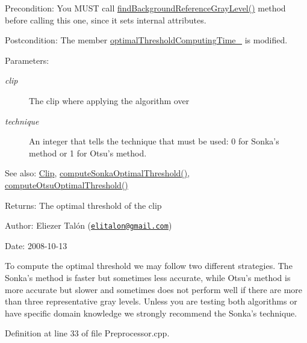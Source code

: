 \begin{Desc}
\item[Precondition:]You MUST call \hyperlink{class_preprocessor_a941f81382bd8e235e4dd12481342be4}{findBackgroundReferenceGrayLevel()} method before calling this one, since it sets internal attributes. \end{Desc}
\begin{Desc}
\item[Postcondition:]The member \hyperlink{class_preprocessor_d606fe1f0be7f7be60583f59278e2df6}{optimalThresholdComputingTime\_\-} is modified.\end{Desc}
\begin{Desc}
\item[Parameters:]
\begin{description}
\item[{\em clip}]The clip where applying the algorithm over \item[{\em technique}]An integer that tells the technique that must be used: 0 for Sonka's method or 1 for Otsu's method.\end{description}
\end{Desc}
\begin{Desc}
\item[See also:]\hyperlink{class_clip}{Clip}, \hyperlink{class_preprocessor_3d4fa7e4721c62997beb93a41d729c99}{computeSonkaOptimalThreshold()}, \hyperlink{class_preprocessor_faa4368f471a3e5d0cb46865a2a1ccb7}{computeOtsuOptimalThreshold()}\end{Desc}
\begin{Desc}
\item[Returns:]The optimal threshold of the clip\end{Desc}
\begin{Desc}
\item[Author:]Eliezer Talón (\href{mailto:elitalon@gmail.com}{\tt elitalon@gmail.com}) \end{Desc}
\begin{Desc}
\item[Date:]2008-10-13\end{Desc}
To compute the optimal threshold we may follow two different strategies. The Sonka's method is faster but sometimes less accurate, while Otsu's method is more accurate but slower and sometimes does not perform well if there are more than three representative gray levels. Unless you are testing both algorithms or have specific domain knowledge we strongly recommend the Sonka's technique. 

Definition at line 33 of file Preprocessor.cpp.

